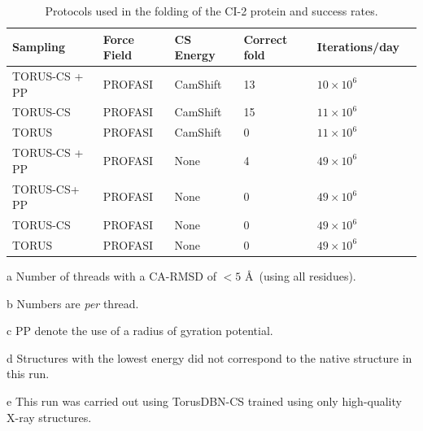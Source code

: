 \begin{table}[h]
    \caption{Protocols used in the folding of the CI-2 protein and success rates.}
    \begin{center}
    \begin{threeparttable}
    \begin{tabular}{l l l l l l}
        Sampling        & Force Field   & CS Energy         & Correct fold\tnote{a} & Iterations/day\tnote{b}\\\hline
          TORUS-CS + PP\tnote{c} & PROFASI       & CamShift          & 13            & $10 \times 10^6$ \\
          TORUS-CS      & PROFASI       & CamShift          & 15            & $11 \times 10^6$\\
          TORUS         & PROFASI       & CamShift          & 0             & $11 \times 10^6$\\
 TORUS-CS + PP\tnote{c} & PROFASI       & None              & 4\tnote{d}      & $49 \times 10^6$\\
 TORUS-CS\tnote{e}+ PP\tnote{c} & PROFASI      & None              & 0             & $49 \times 10^6$\\
          TORUS-CS      & PROFASI       & None              & 0             & $49 \times 10^6$\\
          TORUS         & PROFASI       & None              & 0             & $49 \times 10^6$\\
    \end{tabular}
    \begin{tablenotes}
        \item[a] Number of threads with a CA-RMSD of $<5$ \AA\ (using all residues).\\
        \item[b] Numbers are \textit{per} thread.
        \item[c] PP denote the use of a radius of gyration potential.\\
        \item[d] Structures with the lowest energy did not correspond to the native structure in this run.\\
        \item[e] This run was carried out using TorusDBN-CS trained using only high-quality X-ray structures.
    \end{tablenotes}
    \end{threeparttable}
    \end{center}
\end{table}

